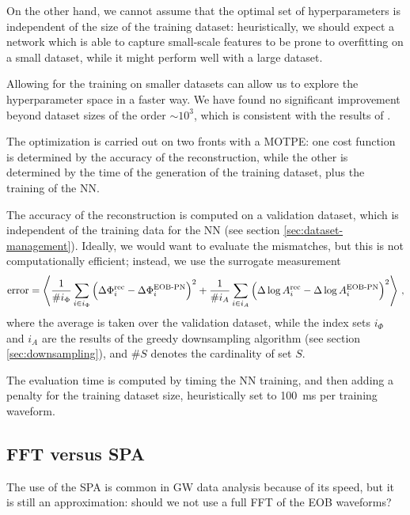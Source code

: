 \documentclass[main.tex]{subfiles}
\begin{document}
On the other hand, we cannot assume that the optimal set of hyperparameters is independent of the size of the training dataset: heuristically, we should expect a network which is able to capture small-scale features to be prone to overfitting on a small dataset, while it might perform well with a large dataset. 

Allowing for the training on smaller datasets can allow us to explore the hyperparameter space in a faster way.
We have found no significant improvement beyond dataset sizes of the order \(\sim 10^3\), which is consistent with the results of \textcite{schmidtMachineLearningGravitational2020}.

The optimization is carried out on two fronts with a \ac{MOTPE}: one cost function is determined by the accuracy of the reconstruction, while the other is determined by the time of the generation of the training dataset, plus the training of the \ac{NN}. 

The accuracy of the reconstruction is computed on a validation dataset, which is independent of the training data for the \ac{NN} (see section \ref{sec:dataset-management}). 
Ideally, we would want to evaluate the mismatches, but this is not computationally efficient; instead, we use the surrogate measurement 
%
\begin{align}
\text{error} =\expval{ \frac{1}{\# i_\Phi } \sum _{i \in i_\Phi } \qty(\Delta \Phi ^{\text{rec}}_i - \Delta \Phi ^{\text{EOB-PN}}_i )^2 + \frac{1}{\# i_A} \sum _{i \in i_A} \qty(\Delta \log A ^{\text{rec}}_i - \Delta \log A ^{\text{EOB-PN}}_i)^2}
\,,
\end{align}
%
where the average is taken over the validation dataset, while the index sets \(i_\Phi \) and \(i_A\) are the results of the greedy downsampling algorithm (see section \ref{sec:downsampling}), and \(\# S\) denotes the cardinality of set \(S\). 

The evaluation time is computed by timing the \ac{NN} training, and then adding a penalty for the training dataset size, heuristically set to \SI{100}{ms} per training waveform. 


\subsection{FFT versus SPA}

The use of the \ac{SPA} is common in \ac{GW} data analysis because of its speed, but it is still an approximation: should we not use a full \ac{FFT} of the \ac{EOB} waveforms? 
\end{document}
